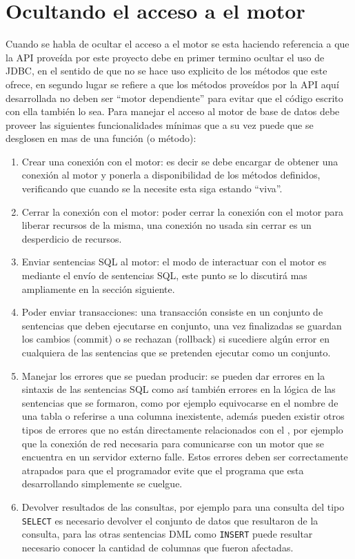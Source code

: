 \section{Ocultando el acceso a el motor}
Cuando se habla de ocultar el acceso a el motor se esta haciendo referencia a que la API proveída por este proyecto debe en primer termino ocultar el uso de JDBC, en el sentido de que no se hace uso explicito de los métodos que este ofrece, en segundo lugar se refiere a que los métodos proveídos por la API aquí desarrollada no deben ser ``motor dependiente'' para evitar que el código escrito con ella también lo sea. Para manejar el acceso al motor de base de datos \jj debe proveer las siguientes funcionalidades mínimas que a su vez puede que se desglosen en mas de una función (o método):
%
\begin{enumerate}
%
\item Crear una conexión con el motor: es decir se debe encargar de obtener una conexión al motor y ponerla a disponibilidad de los métodos definidos, verificando que cuando se la necesite esta siga estando ``viva''.
%
\item Cerrar la conexión con el motor: poder cerrar la conexión con el motor para liberar recursos de la misma, una conexión no usada sin cerrar es un desperdicio de recursos.
%
\item Enviar sentencias SQL al motor: el modo de interactuar con el motor es mediante el envío de sentencias SQL, este punto se lo discutirá mas ampliamente en la sección siguiente.
%
\item Poder enviar transacciones: una transacción consiste en un conjunto de sentencias que deben ejecutarse en conjunto, una vez finalizadas se guardan los cambios (commit) o se rechazan (rollback) si sucediere algún error en cualquiera de las sentencias que se pretenden ejecutar como un conjunto.
%
\item Manejar los errores que se puedan producir: se pueden dar errores en la sintaxis de las sentencias SQL como así también errores en la lógica de las sentencias que se formaron, como por ejemplo equivocarse en el nombre de una tabla o referirse a una columna inexistente, además pueden existir otros tipos de errores que no están directamente relacionados con el \dd, por ejemplo que la conexión de red necesaria para comunicarse con un motor que se encuentra en un servidor externo falle. Estos errores deben ser correctamente atrapados para que el programador evite que el programa que esta desarrollando simplemente se cuelgue.
%
\item Devolver resultados de las consultas, por ejemplo para una consulta del tipo \verb=SELECT= es necesario devolver el conjunto de datos que resultaron de la consulta, para las otras sentencias DML como \verb=INSERT= puede resultar necesario conocer la cantidad de columnas que fueron afectadas.

\end{enumerate}
